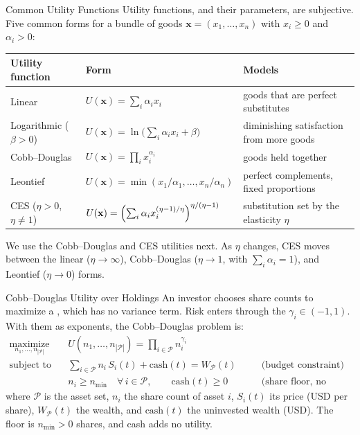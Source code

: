 \documentclass[aspectratio=169,11pt]{beamer}
\newcommand{\bx}{\mathbf{x}}
\newcommand{\WP}{W_{\mathcal{P}}}
\newcommand{\np}{|\mathcal{P}|}
\begin{document}
\begin{frame}{Common Utility Functions}
  Utility functions, and their parameters, are subjective. Five common forms for
  a bundle of goods $\bx=(x_1,\dots,x_n)$ with $x_i\ge0$ and $\alpha_i>0$:

  \vspace{0.4em}
  {\small\setlength{\tabcolsep}{3pt}
  \begin{tabular}{@{}lll@{}}
    \toprule
    \textbf{Utility function} & \textbf{Form} & \textbf{Models}\\
    \midrule
    Linear & $U(\bx)=\sum_i\alpha_ix_i$ & goods that are perfect substitutes\\[0.2em]
    Logarithmic ($\beta>0$) & $U(\bx)=\ln\bigl(\sum_i\alpha_ix_i+\beta\bigr)$ & diminishing satisfaction from more goods\\[0.2em]
    Cobb--Douglas & $U(\bx)=\prod_ix_i^{\alpha_i}$ & goods held together\\[0.2em]
    Leontief & $U(\bx)=\min\left(x_1/\alpha_1,\dots,x_n/\alpha_n\right)$ & perfect complements, fixed proportions\\[0.2em]
    CES ($\eta>0$, $\eta\ne1$) & $U(\bx)=\Bigl(\sum_i\alpha_ix_i^{(\eta-1)/\eta}\Bigr)^{\eta/(\eta-1)}$ & substitution set by the elasticity $\eta$\\
    \bottomrule
  \end{tabular}}

  \vspace{0.8em}
  We use the Cobb--Douglas and CES utilities next. As $\eta$ changes,
  CES moves between the linear ($\eta\to\infty$), Cobb--Douglas ($\eta\to1$, with
  $\sum_i\alpha_i=1$), and Leontief ($\eta\to0$) forms.
\end{frame}

\begin{frame}{Cobb–Douglas Utility over Holdings}
  An investor chooses share counts to maximize a , which has
  no variance term. Risk enters through the 
  $\gamma_i\in(-1,1)$. With them as exponents, the Cobb--Douglas problem is:
  \[
    \boxed{\begin{aligned}
      \operatorname*{maximize}_{n_1,\ldots,n_{\np}}\quad&U(n_1,\ldots,n_{\np})=\prod_{i\in\mathcal{P}}n_i^{\gamma_i}\\
      \text{subject to}\quad&\sum_{i\in\mathcal{P}}n_i\,S_i(t)+\text{cash}(t)=\WP(t)&&\quad\text{(budget constraint)}\\
      &n_i\ge n_{\min}\quad\forall\,i\in\mathcal{P},\qquad\text{cash}(t)\ge0&&\quad\text{(share floor, no borrowing)}
    \end{aligned}}
  \]
  where $\mathcal{P}$ is the asset set, $n_i$ the share count of asset $i$, $S_i(t)$ its price (USD per share),
  $\WP(t)$ the wealth, and $\text{cash}(t)$ the uninvested wealth (USD). The floor is
  $n_{\min}>0$ shares, and cash adds no utility.
\end{frame}
\end{document}
